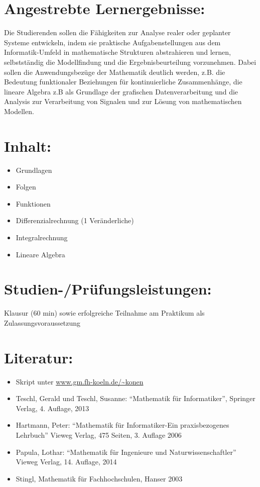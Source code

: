 \section*{Angestrebte
Lernergebnisse:}\label{angestrebte-lernergebnisse-13}

Die Studierenden sollen die Fähigkeiten zur Analyse realer oder
geplanter Systeme entwickeln, indem sie praktische Aufgabenstellungen
aus dem Informatik-Umfeld in mathematische Strukturen abstrahieren und
lernen, selbstständig die Modellfindung und die Ergebnisbeurteilung
vorzunehmen. Dabei sollen die Anwendungsbezüge der Mathematik deutlich
werden, z.B. die Bedeutung funktionaler Beziehungen für kontinuierliche
Zusammenhänge, die lineare Algebra z.B als Grundlage der grafischen
Datenverarbeitung und die Analysis zur Verarbeitung von Signalen und zur
Lösung von mathematischen Modellen.

\section*{Inhalt:}\label{inhalt-13}

\begin{itemize}
\item
  Grundlagen
\item
  Folgen
\item
  Funktionen
\item
  Differenzialrechnung (1 Veränderliche)
\item
  Integralrechnung
\item
  Lineare Algebra
\end{itemize}

\section*{Studien-/Prüfungsleistungen:}\label{studien-pruxfcfungsleistungen-11}

Klausur (60 min) sowie erfolgreiche Teilnahme am Praktikum als
Zulassungsvoraussetzung

\section*{Literatur:}\label{literatur-10}

\begin{itemize}
\item
  Skript unter \url{www.gm.fh-koeln.de/~konen}
\item
  Teschl, Gerald und Teschl, Susanne: ``Mathematik für Informatiker'',
  Springer Verlag, 4. Auflage, 2013
\item
  Hartmann, Peter: ``Mathematik für Informatiker-Ein praxisbezogenes
  Lehrbuch'' Vieweg Verlag, 475 Seiten, 3. Auflage 2006
\item
  Papula, Lothar: ``Mathematik für Ingenieure und Naturwissenschaftler''
  Vieweg Verlag, 14. Auflage, 2014
\item
  Stingl, Mathematik für Fachhochschulen, Hanser 2003
\end{itemize}

